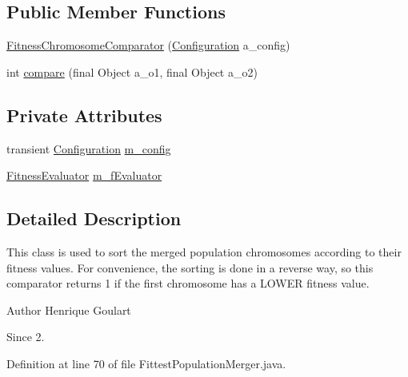 \subsection*{Public Member Functions}
\begin{DoxyCompactItemize}
\item 
\hyperlink{classorg_1_1jgap_1_1impl_1_1_fittest_population_merger_1_1_fitness_chromosome_comparator_ab79497d78006f00ad8b44d17ed7c5754}{Fitness\-Chromosome\-Comparator} (\hyperlink{classorg_1_1jgap_1_1_configuration}{Configuration} a\-\_\-config)
\item 
int \hyperlink{classorg_1_1jgap_1_1impl_1_1_fittest_population_merger_1_1_fitness_chromosome_comparator_aec3a8e6ecb333a9bea1622b296ac3862}{compare} (final Object a\-\_\-o1, final Object a\-\_\-o2)
\end{DoxyCompactItemize}
\subsection*{Private Attributes}
\begin{DoxyCompactItemize}
\item 
transient \hyperlink{classorg_1_1jgap_1_1_configuration}{Configuration} \hyperlink{classorg_1_1jgap_1_1impl_1_1_fittest_population_merger_1_1_fitness_chromosome_comparator_aaaba5731a677aee1ea363ef9b6b743c2}{m\-\_\-config}
\item 
\hyperlink{interfaceorg_1_1jgap_1_1_fitness_evaluator}{Fitness\-Evaluator} \hyperlink{classorg_1_1jgap_1_1impl_1_1_fittest_population_merger_1_1_fitness_chromosome_comparator_a838ea1ddebe662371b8e23855368e999}{m\-\_\-f\-Evaluator}
\end{DoxyCompactItemize}


\subsection{Detailed Description}
This class is used to sort the merged population chromosomes according to their fitness values. For convenience, the sorting is done in a reverse way, so this comparator returns 1 if the first chromosome has a L\-O\-W\-E\-R fitness value.

\begin{DoxyAuthor}{Author}
Henrique Goulart 
\end{DoxyAuthor}
\begin{DoxySince}{Since}
2. 
\end{DoxySince}


Definition at line 70 of file Fittest\-Population\-Merger.\-java.



